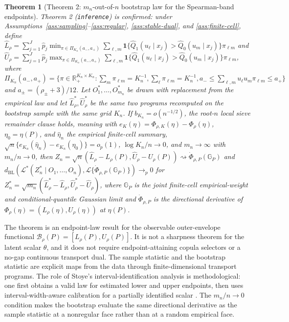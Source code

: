 \documentclass[11pt]{article}
\newcommand{\one}{\mathbf{1}}
\theoremstyle{definition}
\theoremstyle{plain}
\newtheorem{theorem}{Theorem}
\theoremstyle{remark}
\begin{document}
\begin{theorem}[Theorem 2: \(m_n\)-out-of-\(n\) bootstrap law for the Spearman-band endpoints]\label{thm:inference}\label{prop:inference}
Theorem 2 (\texttt{inference}) is confirmed: under Assumptions~\ref{ass:sampling}--\ref{ass:regular}, \ref{ass:stable-dual}, and \ref{ass:finite-cell}, define \(\widehat L_\rho=\sum_{j=1}^J\widehat p_j\min_{\pi\in\Pi_{K_n}(a_-,a_+)}\sum_{\ell,m}\one\{\widehat Q_1(u_\ell\mid x_j)>\widehat Q_0(u_m\mid x_j)\}\pi_{\ell m}\) and \(\widehat U_\rho=\sum_{j=1}^J\widehat p_j\max_{\pi\in\Pi_{K_n}(a_-,a_+)}\sum_{\ell,m}\one\{\widehat Q_1(u_\ell\mid x_j)>\widehat Q_0(u_m\mid x_j)\}\pi_{\ell m}\), where \(\Pi_{K_n}(a_-,a_+)=\{\pi\in\mathbb R_+^{K_n\times K_n}:\sum_m\pi_{\ell m}=K_n^{-1},\sum_\ell\pi_{\ell m}=K_n^{-1},a_-\le\sum_{\ell,m}u_\ell u_m\pi_{\ell m}\le a_+\}\) and \(a_\pm=(\rho_\pm+3)/12\). Let \(O_1^*,\ldots,O_{m_n}^*\) be drawn with replacement from the empirical law and let \(\widehat L_\rho^*,\widehat U_\rho^*\) be the same two programs recomputed on the bootstrap sample with the same grid \(K_n\). If \(b_{K_n}=o(n^{-1/2})\), the root-\(n\) local sieve remainder clause holds, meaning with \(e_K(\eta)=\Phi_{\rho,K}(\eta)-\Phi_\rho(\eta)\), \(\eta_0=\eta(P)\), and \(\widehat\eta_n\) the empirical finite-cell summary, \(\sqrt n\{e_{K_n}(\widehat\eta_n)-e_{K_n}(\eta_0)\}=o_p(1)\), \(\log K_n/n\to0\), and \(m_n\to\infty\) with \(m_n/n\to0\), then \(Z_n=\sqrt n(\widehat L_\rho-L_\rho(P),\widehat U_\rho-U_\rho(P))\rightsquigarrow\dot\Phi_{\rho,P}(\mathbb G_P)\) and \(d_{\mathrm{BL}}(\mathcal L^*(Z_n^*\mid O_1,\ldots,O_n),\mathcal L\{\dot\Phi_{\rho,P}(\mathbb G_P)\})\to_p0\) for \(Z_n^*=\sqrt{m_n}(\widehat L_\rho^*-\widehat L_\rho,\widehat U_\rho^*-\widehat U_\rho)\), where \(\mathbb G_P\) is the joint finite-cell empirical-weight and conditional-quantile Gaussian limit and \(\dot\Phi_{\rho,P}\) is the directional derivative of \(\Phi_\rho(\eta)=(L_\rho(\eta),U_\rho(\eta))\) at \(\eta(P)\).
\end{theorem}

The theorem is an endpoint-law result for the observable outer-envelope functional \(\mathcal B_\rho(P)=[L_\rho(P),U_\rho(P)]\).  It is not a sharpness theorem for the latent scalar \(\theta\), and it does not require endpoint-attaining copula selectors or a no-gap continuous transport dual.  The sample statistic and the bootstrap statistic are explicit maps from the data through finite-dimensional transport programs.  The role of Stoye's interval-identification analysis is methodological: one first obtains a valid law for estimated lower and upper endpoints, then uses interval-width-aware calibration for a partially identified scalar \cite{Stoye2009MoreCI}.  The \(m_n/n\to0\) condition makes the bootstrap evaluate the same directional derivative as the sample statistic at a nonregular face rather than at a random empirical face.
\end{document}
